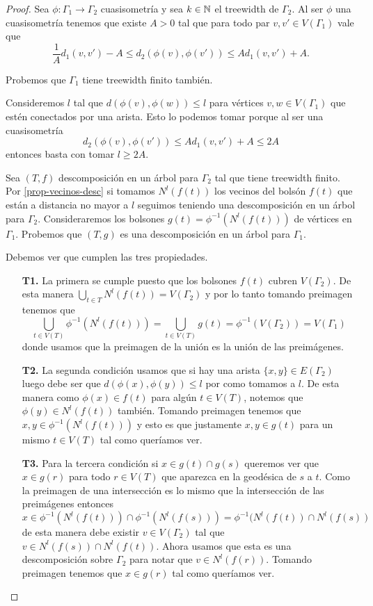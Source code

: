 \documentclass[tesis.tex]{subfiles}
\begin{document}
\begin{proof}
	Sea $\phi:\Gamma_1 \to \Gamma_2$ cuasisometría y sea $k \in \mathbb{N}$ el treewidth de $\Gamma_2$.
	Al ser $\phi$ una cuasisometría tenemos que existe $A > 0$ tal que para todo par $v,v' \in V(\Gamma_{1})$ vale que
	\[
	\frac{1}{A} d_{1}(v,v') - A \le d_{2}(\phi(v),\phi(v')) \le A d_{1}(v,v') + A.
	\]
	
	Probemos que $\Gamma_1$ tiene treewidth finito también.
	
	Consideremos $l$ tal que $d(\phi(v),\phi(w)) \le l$ para vértices $v,w \in V(\Gamma_1)$ que estén conectados por una arista.
	Esto lo podemos tomar porque al ser una cuasisometría 
	\[
	d_{2}(\phi(v),\phi(v')) \le A d_{1}(v,v') + A  \le 2A
	\]
	entonces basta con tomar $l \ge 2A$.
	
	Sea $(T,f)$ descomposición en un árbol para $\Gamma_{2}$ tal que tiene treewidth finito.
	Por \ref{prop-vecinos-desc} si tomamos $N^l(f(t))$ los vecinos del bolsón $f(t)$ que están a distancia no mayor a $l$ seguimos teniendo una descomposición en un árbol para $\Gamma_{2}$.  
	Consideraremos los bolsones $g(t) = \phi^{-1}(N^l(f(t)))$ de vértices en $\Gamma_1$. 
	Probemos que $(T,g)$ es una descomposición en un árbol para $\Gamma_{1}$.
	
	Debemos ver que cumplen las tres propiedades.
	
	\begin{enumerate}
		\item[\textbf{T1.}] La primera se cumple puesto que los bolsones $f(t)$ cubren $V(\Gamma_2)$. 
		De esta manera $\bigcup_{t \in T} N^l(f(t)) = V(\Gamma_2)$ y por lo tanto tomando preimagen tenemos que
		\[
		\bigcup_{t \in V(T)} \phi^{-1} (N^l (f(t))) = \bigcup_{t \in V(T)} g(t) = \phi^{-1} (V(\Gamma_2)) = V(\Gamma_1)
		\] 
		donde usamos que la preimagen de la unión es la unión de las preimágenes.
		\item[\textbf{T2.}] La segunda condición usamos que si hay una arista $\{x,y\} \in E(\Gamma_2)$ luego debe ser que $d(\phi(x),\phi(y)) \le l$ por como tomamos a $l$.
		De esta manera como $\phi(x) \in f(t)$ para algún $t \in V(T)$, notemos que $\phi(y) \in N^l(f(t))$ también. 
		Tomando preimagen tenemos que $x,y \in \phi^{-1}(N^l(f(t)))$ y esto es que justamente $x,y \in g(t)$ para un mismo $t \in V(T)$ tal como queríamos ver.		
		\item[\textbf{T3.}] Para la tercera condición si $x \in g(t) \cap g(s)$ queremos ver que $x \in g(r)$ para todo $r \in V(T)$ que aparezca en la geodésica de $s$ a $t$.
		Como la preimagen de una intersección es lo mismo que la intersección de las preimágenes entonces 
		\[
		x \in \phi^{-1}(N^l(f(t))) \cap \phi^{-1}(N^l(f(s))) = \phi^{-1}(N^l(f(t)) \cap N^l (f(s))
		\]
		de esta manera debe existir $v \in V(\Gamma_2)$ tal que $v \in N^l(f(s)) \cap N^l(f(t))$.
		Ahora usamos que esta es una descomposición sobre $\Gamma_2$ para notar que $v \in N^l(f(r))$.
		Tomando preimagen tenemos que $x \in g(r)$ tal como queríamos ver.
	\end{enumerate}
	

\end{proof}
\end{document}
